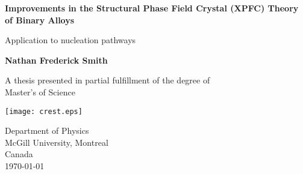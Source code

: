 \begin{titlepage}
    \begin{center}
        \vspace*{1cm}
        
        \Huge
        \textbf{
            Improvements in the Structural Phase Field Crystal (XPFC) Theory of Binary Alloys
        }
        
        \vspace{0.5cm}
        \LARGE
        Application to nucleation pathways
        
        \vspace{1.5cm}
        \Large 
        \textbf{Nathan Frederick Smith}
        
        \vfill

        \Large
        A thesis presented in partial fulfillment of the degree of\\
        Master's of Science
        
        \vspace{0.8cm}
        
        \texttt{[image: crest.eps]}
        
        \Large
        Department of Physics\\
        McGill University, Montreal\\
        Canada\\
        \today
        
    \end{center}
\end{titlepage}

